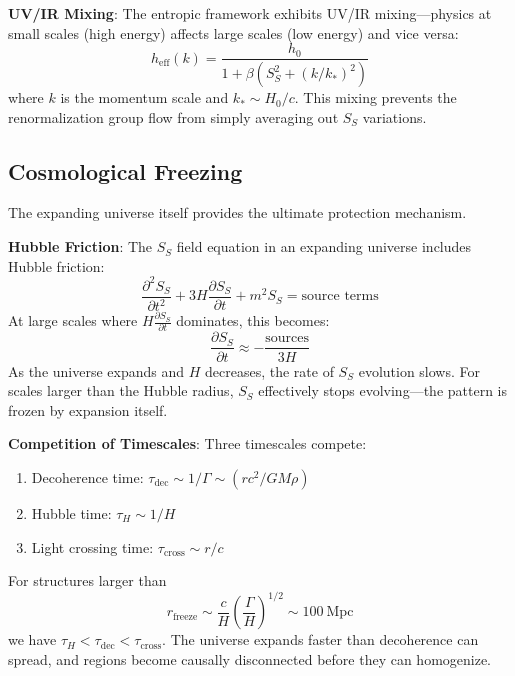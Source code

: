 \documentclass[12pt]{article}
\begin{document}
\textbf{UV/IR Mixing}: The entropic framework exhibits UV/IR mixing---physics at small scales (high energy) affects large scales (low energy) and vice versa:
\begin{equation}
    h_\mathrm{eff}(k) = \frac{h_0}{1 + \beta\left(S_S^2 + (k/k_*)^2\right)}
\end{equation}
where $k$ is the momentum scale and $k_* \sim H_0/c$. This mixing prevents the renormalization group flow from simply averaging out $S_S$ variations.

\subsection{Cosmological Freezing}

The expanding universe itself provides the ultimate protection mechanism.

\textbf{Hubble Friction}: The $S_S$ field equation in an expanding universe includes Hubble friction:
\begin{equation}
    \frac{\partial^2 S_S}{\partial t^2} + 3 H \frac{\partial S_S}{\partial t} + m^2 S_S = \textrm{source terms}
\end{equation}
At large scales where $H \frac{\partial S_S}{\partial t}$ dominates, this becomes:
\begin{equation}
    \frac{\partial S_S}{\partial t} \approx -\frac{\textrm{sources}}{3H}
\end{equation}
As the universe expands and $H$ decreases, the rate of $S_S$ evolution slows. For scales larger than the Hubble radius, $S_S$ effectively stops evolving---the pattern is frozen by expansion itself.

\textbf{Competition of Timescales}: Three timescales compete:
\begin{enumerate}
    \item Decoherence time: $\tau_\mathrm{dec} \sim 1/\Gamma \sim (r c^2/GM \rho)$
    \item Hubble time: $\tau_H \sim 1/H$
    \item Light crossing time: $\tau_\mathrm{cross} \sim r/c$
\end{enumerate}
For structures larger than
\begin{equation}
    r_\mathrm{freeze} \sim \frac{c}{H} \left(\frac{\Gamma}{H}\right)^{1/2} \sim 100~\textrm{Mpc}
\end{equation}
we have $\tau_H < \tau_\mathrm{dec} < \tau_\mathrm{cross}$. The universe expands faster than decoherence can spread, and regions become causally disconnected before they can homogenize.
\end{document}
